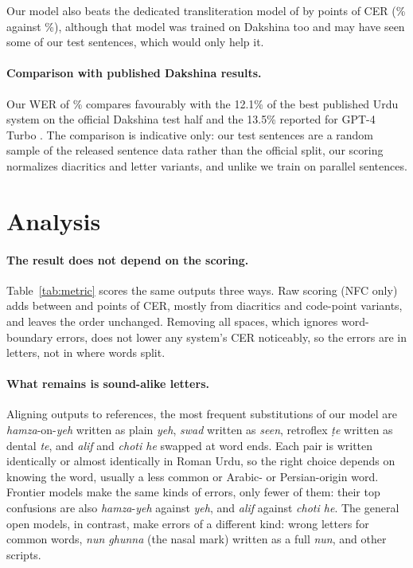 \documentclass[11pt]{article}
\begin{document}
Our model also beats the dedicated transliteration model of \citet{butt2025translit} by \MarginMtwoM points of CER (\MtwoMCER\% against \OursCER\%), although that model was trained on Dakshina too and may have seen some of our test sentences, which would only help it.

\paragraph{Comparison with published Dakshina results.} Our WER of \OursWER\% compares favourably with the 12.1\% of the best published Urdu system on the official Dakshina test half \citep{kirov2024context} and the 13.5\% reported for GPT-4 Turbo \citep{alam2025normalizer}. The comparison is indicative only: our test sentences are a random sample of the released sentence data rather than the official split, our scoring normalizes diacritics and letter variants, and unlike \citet{kirov2024context} we train on parallel sentences.

\section{Analysis}\label{sec:analysis}

\paragraph{The result does not depend on the scoring.} Table~\ref{tab:metric} scores the same outputs three ways. Raw scoring (NFC only) adds between \RawAddMin and \RawAddMax points of CER, mostly from diacritics and code-point variants, and leaves the order unchanged. Removing all spaces, which ignores word-boundary errors, does not lower any system's CER noticeably, so the errors are in letters, not in where words split.

\paragraph{What remains is sound-alike letters.} Aligning outputs to references, the most frequent substitutions of our model are \textit{hamza}-on-\textit{yeh} written as plain \textit{yeh}, \textit{swad} written as \textit{seen}, retroflex \textit{\d{t}e} written as dental \textit{te}, and \textit{alif} and \textit{choti he} swapped at word ends. Each pair is written identically or almost identically in Roman Urdu, so the right choice depends on knowing the word, usually a less common or Arabic- or Persian-origin word. Frontier models make the same kinds of errors, only fewer of them: their top confusions are also \textit{hamza}-\textit{yeh} against \textit{yeh}, and \textit{alif} against \textit{choti he}. The general open models, in contrast, make errors of a different kind: wrong letters for common words, \textit{nun ghunna} (the nasal mark) written as a full \textit{nun}, and other scripts.
\end{document}
